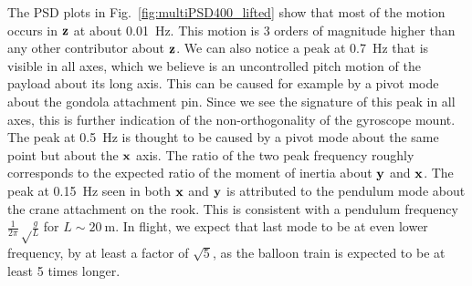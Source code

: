 The PSD plots in Fig.~\ref{fig:multiPSD400_lifted} show that most of the motion occurs in $\textrm{\textbf{z}}$ at about \SI{0.01}{\hertz}. This motion is 3 orders of magnitude higher than any other contributor about $\textrm{\textbf{z}}$. We can also notice a peak at \SI{0.7}{\hertz} that is visible in all axes, which we believe is an uncontrolled pitch motion of the payload about its long axis. This can be caused for example by a pivot mode about the gondola attachment pin. Since we see the signature of this peak in all axes, this is further indication of the non-orthogonality of the gyroscope mount. The peak at \SI{0.5}{\hertz} is thought to be caused by a pivot mode about the same point but about the $\textrm{\textbf{x}}$ axis. The ratio of the two peak frequency roughly corresponds to the expected ratio of the moment of inertia about $\textrm{\textbf{y}}$ and $\textrm{\textbf{x}}$. The peak at \SI{0.15}{\hertz} seen in both $\textrm{\textbf{x}}$ and $\textrm{\textbf{y}}$ is attributed to the pendulum mode about the crane attachment on the rook. This is consistent with a pendulum frequency $\frac{1}{2\pi}\sqrt\frac{g}{L}$ for $L\sim\SI{20}{\meter}$. In flight, we expect that last mode to be at even lower frequency, by at least a factor of $\sqrt{5}$, as the balloon train is expected to be at least 5 times longer.

